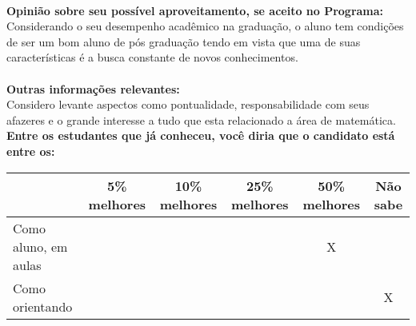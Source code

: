 \documentclass[11pt]{article}
\begin{document}
\\
\textbf{Opinião sobre seu possível aproveitamento, se aceito no Programa:}
\\Considerando o seu desempenho acadêmico na graduação, o aluno tem condições de ser um bom aluno de pós graduação tendo em vista que uma de suas características é a busca constante de novos conhecimentos.\\ 
\\
\textbf{Outras informações relevantes:} \\Considero levante aspectos como pontualidade, responsabilidade com seus afazeres e o grande interesse a tudo que esta relacionado a área de matemática.
\\[0.3cm]
\textbf{Entre os estudantes que já conheceu, você diria que o candidato está entre os:}
\\
\begin{tabular}{|l|c|c|c|c|c|}
\hline
 & 5\% melhores & 10\% melhores & 25\% melhores & 50\% melhores & Não sabe \\
\hline
Como aluno, em aulas &  &  &  & X & \\
\hline
Como orientando &  &  &  &  & X\\
\hline
\end{tabular}
\end{document}
